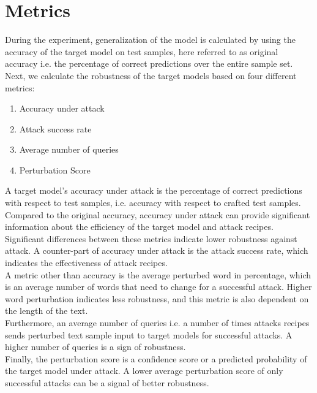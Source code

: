 \documentclass[%
	BCOR=8mm, %
	DIV=12,
	toc=bibliography, %
	toc=listof, %
	oneside, %
	egregdoesnotlikesansseriftitles, %
	]{scrbook}
\begin{document}
\section{Metrics}
\label{section:metrics}
During the experiment, generalization of the model is calculated by using the accuracy of the target model on test samples, here referred to as original accuracy i.e. the percentage of correct predictions over the entire sample set.
Next, we calculate the robustness of the target models based on four different metrics: 
\begin{enumerate}
    \item Accuracy under attack 
    \item Attack success rate
    \item  Average number of queries
    \item Perturbation Score
\end{enumerate}
A target model's accuracy under attack is the percentage of correct predictions with respect to test samples, i.e. accuracy with respect to crafted test samples. Compared to the original accuracy, accuracy under attack can provide significant information about the efficiency of the target model and attack recipes. Significant differences between these metrics indicate lower robustness against attack. A counter-part of accuracy under attack is the attack success rate, which indicates the effectiveness of attack recipes.\\
A metric other than accuracy is the average perturbed word in percentage, which is an average number of words that need to change for a successful attack. Higher word perturbation indicates less robustness, and this metric is also dependent on the length of the text. \\
Furthermore, an average number of queries i.e. a number of times attacks recipes sends perturbed text sample input to target models for successful attacks. A higher number of queries is a sign of robustness.\\
Finally, the perturbation score is a confidence score or a predicted probability of the target model under attack. A lower average perturbation score of only successful attacks can be a signal of better robustness. 
\end{document}
